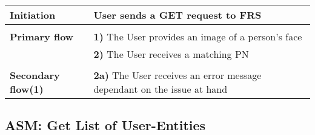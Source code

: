 \documentclass[a4paper,11pt]{article}
\begin{document}
\begin{tabular}{|p{3.5cm}|p{11.5cm}|}
    \textbf{Initiation} & User sends a GET request to FRS
        
    \\ \hline \rowcolor{Gray} & \\ \hline 
         
    \textbf{Primary flow} & 
    \textbf{1)} The User provides an image of a person's face \\&
    \textbf{2)} The User receives a matching PN
        
    \\ \hline \rowcolor{Gray} & \\ \hline 
         
    \textbf{Secondary flow(1)} & 
    \textbf{2a)} The User receives an error message dependant on the issue at hand
    
    \\ \hline 
\end{tabular}


\subsection{ASM: Get List of User-Entities}
\end{document}
